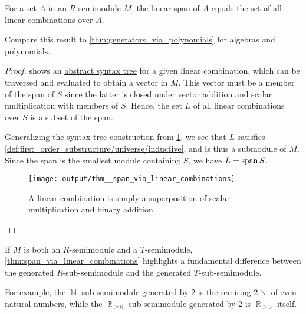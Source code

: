 \begin{proposition}\label{thm:span_via_linear_combinations}
  For a set \( A \) in an \( R \)-\hyperref[def:semimodule]{semimodule} \( M \), the \hyperref[def:semimodule/generated]{linear span} of \( A \) equals the set of all \hyperref[def:linear_combination]{linear combinations} over \( A \).
\end{proposition}
\begin{comments}
  \item Compare this result to \cref{thm:generators_via_polynomials} for algebras and polynomials.
\end{comments}
\begin{proof}
   shows an \hyperref[con:abstract_syntax_tree]{abstract syntax tree} for a given linear combination, which can be traversed and evaluated to obtain a vector in \( M \). This vector must be a member of the span of \( S \) since the latter is closed under vector addition and scalar multiplication with members of \( S \). Hence, the set \( L \) of all linear combinations over \( S \) is a subset of the span.

  Generalizing the syntax tree construction from \cref{fig:thm:span_via_linear_combinations}, we see that \( L \) satisfies \cref{def:first_order_substructure/universe/inductive}, and is thus a submodule of \( M \). Since the span is the smallest module containing \( S \), we have \( L = \operatorname{span} S \).

  \begin{figure}[!ht]
    \hfill
    \texttt{[image: output/thm\_\_span\_via\_linear\_combinations]}
    \hfill\hfill
    \caption{A linear combination is simply a \hyperref[con:function_superposition]{superposition} of scalar multiplication and binary addition.}
    \label{fig:thm:span_via_linear_combinations}
  \end{figure}
\end{proof}

\begin{remark}\label{rem:span_over_different_semirings}
  If \( M \) is both an \( R \)-semimodule and a \( T \)-semimodule, \cref{thm:span_via_linear_combinations} highlights a fundamental difference between the generated \( R \)-sub-semimodule and the generated \( T \)-sub-semimodule.

  For example, the \( \BbbN \)-sub-semimodule generated by \( 2 \) is the semiring \( 2\BbbN \) of even natural numbers, while the \( \BbbR_{\geq 0} \)-sub-semimodule generated by \( 2 \) is \( \BbbR_{\geq 0} \) itself.
\end{remark}

